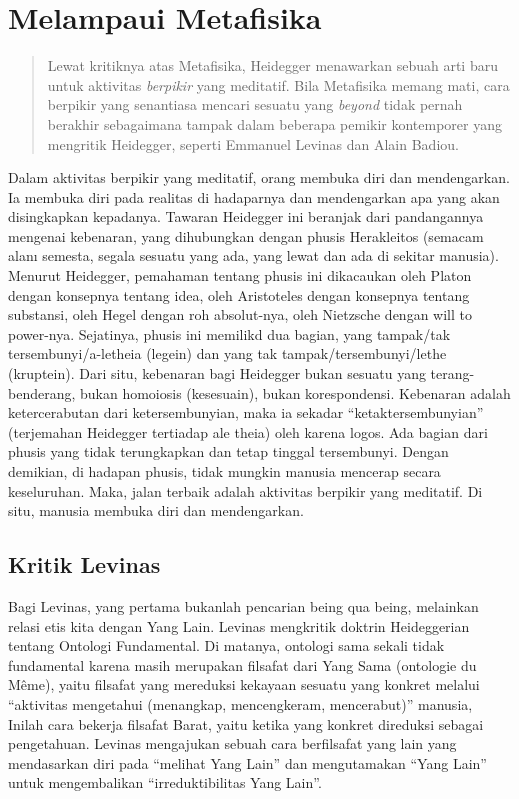 \documentclass[11pt,twoside,a5paper,openany]{memoir}
\begin{document}
\hypertarget{melampaui-metafisika}{%
\section{Melampaui Metafisika}\label{melampaui-metafisika}}

\begin{quote}
Lewat kritiknya atas Metafisika, Heidegger menawarkan sebuah arti baru
untuk aktivitas \emph{berpikir} yang meditatif. Bila Metafisika memang
mati, cara berpikir yang senantiasa mencari sesuatu yang \emph{beyond}
tidak pernah berakhir sebagaimana tampak dalam beberapa pemikir
kontemporer yang mengritik Heidegger, seperti Emmanuel Levinas dan Alain
Badiou.
\end{quote}

Dalam aktivitas berpikir yang meditatif, orang membuka diri dan
mendengarkan. Ia membuka diri pada realitas di hadaparnya dan
mendengarkan apa yang akan disingkapkan kepadanya. Tawaran Heidegger ini
beranjak dari pandangannya mengenai kebenaran, yang dihubungkan dengan
phusis Herakleitos (semacam alanı semesta, segala sesuatu yang ada, yang
lewat dan ada di sekitar manusia). Menurut Heidegger, pemahaman tentang
phusis ini dikacaukan oleh Platon dengan konsepnya tentang idea, oleh
Aristoteles dengan konsepnya tentang substansi, oleh Hegel dengan roh
absolut-nya, oleh Nietzsche dengan will to power-nya. Sejatinya, phusis
ini memilikd dua bagian, yang tampak/tak tersembunyi/a-letheia (legein)
dan yang tak tampak/tersembunyi/lethe (kruptein). Dari situ, kebenaran
bagi Heidegger bukan sesuatu yang terang-benderang, bukan homoiosis
(kesesuain), bukan korespondensi. Kebenaran adalah ketercerabutan dari
ketersembunyian, maka ia sekadar ``ketaktersembunyian'' (terjemahan
Heidegger tertiadap ale theia) oleh karena logos. Ada bagian dari phusis
yang tidak terungkapkan dan tetap tinggal tersembunyi. Dengan demikian,
di hadapan phusis, tidak mungkin manusia mencerap secara keseluruhan.
Maka, jalan terbaik adalah aktivitas berpikir yang meditatif. Di situ,
manusia membuka diri dan mendengarkan.

\hypertarget{kritik-levinas}{%
\subsection{Kritik Levinas}\label{kritik-levinas}}

Bagi Levinas, yang pertama bukanlah pencarian being qua being, melainkan
relasi etis kita dengan Yang Lain. Levinas mengkritik doktrin
Heideggerian tentang Ontologi Fundamental. Di matanya, ontologi sama
sekali tidak fundamental karena masih merupakan filsafat dari Yang Sama
(ontologie du Même), yaitu filsafat yang mereduksi kekayaan sesuatu yang
konkret melalui ``aktivitas mengetahui (menangkap, mencengkeram,
mencerabut)'' manusia, Inilah cara bekerja filsafat Barat, yaitu ketika
yang konkret direduksi sebagai pengetahuan. Levinas mengajukan sebuah
cara berfilsafat yang lain yang mendasarkan diri pada ``melihat Yang
Lain'' dan mengutamakan ``Yang Lain'' untuk mengembalikan
``irreduktibilitas Yang Lain''.
\end{document}
